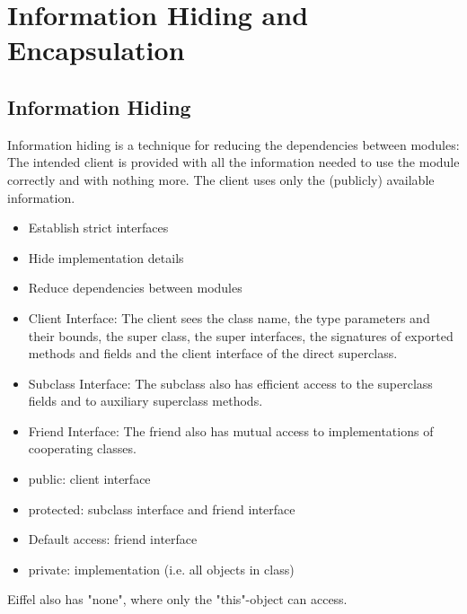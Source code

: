 \section{Information Hiding and Encapsulation}
\subsection{Information Hiding}
\begin{mytitle} Information hiding is a technique for reducing the dependencies between modules: The intended client is provided with all the information needed to use the module correctly and with nothing more. The client uses only the (publicly) available information.
\end{mytitle}
\begin{mytitle}[Objectives] \hfill
\begin{itemize}
    \item Establish strict interfaces
    \item Hide implementation details
    \item Reduce dependencies between modules
\end{itemize}
\end{mytitle}
\begin{mytitle} \hfill
\begin{itemize}
    \item Client Interface: The client sees the class name, the type parameters and their bounds, the super class, the super interfaces, the signatures of exported methods and fields and the client interface of the direct superclass.
    \item Subclass Interface: The subclass also has efficient access to the superclass fields and to auxiliary superclass methods.
    \item Friend Interface: The friend also has mutual access to implementations of cooperating classes.
\end{itemize}
\end{mytitle}
\begin{mytitle}\hfill
\begin{itemize}
    \item public: client interface
    \item protected: subclass interface and friend interface
    \item Default access: friend interface
    \item private: implementation (i.e. all objects in class)
\end{itemize}
Eiffel also has "none", where only the "this"-object can access.
\end{mytitle}
